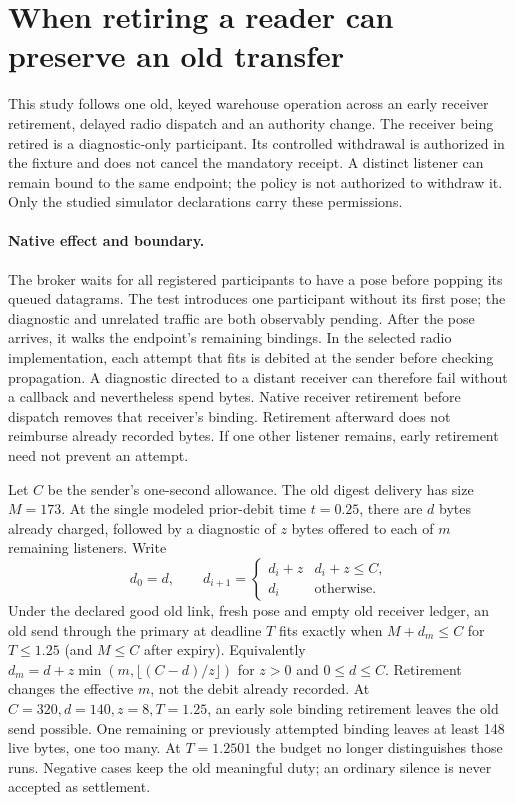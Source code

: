 \documentclass{article}
\begin{document}
\section*{When retiring a reader can preserve an old transfer}
This study follows one old, keyed warehouse operation across an early
receiver retirement, delayed radio dispatch and an authority change.
The receiver being retired is a diagnostic-only participant. Its
controlled withdrawal is authorized in the fixture and does not
cancel the mandatory receipt. A distinct listener can remain bound
to the same endpoint; the policy is not authorized to withdraw it.
Only the studied simulator declarations carry these permissions.

\paragraph{Native effect and boundary.}
The broker waits for all registered participants to have a pose before
popping its queued datagrams. The test introduces one participant
without its first pose; the diagnostic and unrelated traffic are both
observably pending. After the pose arrives, it walks the endpoint's
remaining bindings. In the selected radio implementation, each
attempt that fits is debited at the sender before checking propagation.
A diagnostic directed to a distant receiver can therefore fail without
a callback and nevertheless spend bytes. Native receiver retirement
before dispatch removes that receiver's binding. Retirement afterward
does not reimburse already recorded bytes. If one other listener
remains, early retirement need not prevent an attempt.

Let $C$ be the sender's one-second allowance. The old digest delivery
has size $M=173$. At the single modeled prior-debit time $t=0.25$,
there are $d$ bytes already charged, followed by a diagnostic of $z$
bytes offered to each of $m$ remaining listeners. Write
\[
d_0=d,\qquad
d_{i+1}=\begin{cases}d_i+z&d_i+z\le C,\\d_i&\text{otherwise.}\end{cases}
\]
Under the declared good old link, fresh pose and empty old receiver
ledger, an old send through the primary at deadline $T$ fits exactly
when $M+d_m\le C$ for $T\le1.25$ (and $M\le C$ after expiry).
Equivalently $d_m=d+z\min(m,\lfloor (C-d)/z\rfloor)$ for $z>0$
and $0\le d\le C$. Retirement changes the effective $m$, not the
debit already recorded.
At $C=320,d=140,z=8,T=1.25$, an early sole binding retirement leaves
the old send possible. One remaining or previously attempted binding
leaves at least 148 live bytes, one too many. At $T=1.2501$ the budget
no longer distinguishes those runs. Negative cases keep the old
meaningful duty; an ordinary silence is never accepted as settlement.
\end{document}
